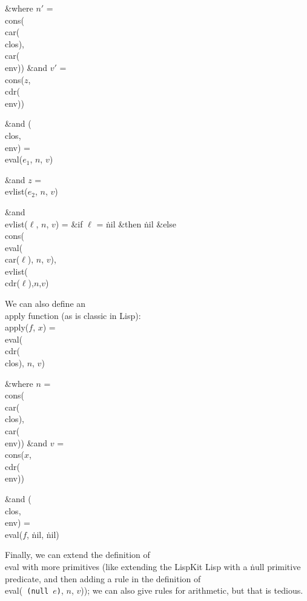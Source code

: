 \&{where} $n'$ = \\{cons}(\\{car}(\\{clos}), \\{car}(\\{env})) \&{and}
$v'$ = \\{cons}($z$, \\{cdr}(\\{env}))

\&{and} (\\{clos}, \\{env}) = \\{eval}($e_{1}$, $n$, $v$)

\&{and} $z$ = \\{evlist}($e_{2}$, $n$, $v$)

\&{and} \\{evlist}($\ell$, $n$, $v$) = \&{if} $\ell$ = \.{nil} \&{then}
\.{nil} \&{else} \\{cons}(\\{eval}(\\{car}($\ell$), $n$, $v$), \\{evlist}(%
\\{cdr}($\ell$),$n$,$v$)


\bigskip
\noindent We can also define an \\{apply} function (as is classic in Lisp):
\bull
\\{apply}($f$, $x$) = \\{eval}(\\{cdr}(\\{clos}), $n$, $v$)

\&{where} $n$ = \\{cons}(\\{car}(\\{clos}), \\{car}(\\{env}))
\&{and} $v$ = \\{cons}($x$, \\{cdr}(\\{env}))

\&{and} (\\{clos}, \\{env}) = \\{eval}($f$, \.{nil}, \.{nil})

\bigskip
\noindent Finally, we can extend the definition of \\{eval} with more
primitives (like extending the LispKit Lisp with a \.{null} primitive
predicate, and then adding a rule in the definition of \\{eval}({\tt
(null $e$)}, $n$, $v$)); we can also give rules for arithmetic, but
that is tedious.

